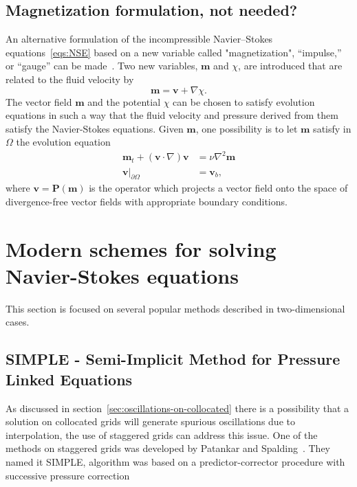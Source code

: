 \documentclass{article}
\begin{document}
	
	
	
	\subsection{Magnetization formulation, not needed?}
	
	
	An alternative formulation of the incompressible Navier–Stokes equations~\eqref{eqs:NSE} based on a new variable called "magnetization", “impulse,” or “gauge” can be made~\cite{Brown:2001}. Two new variables, $\boldsymbol{m}$ and $\chi$, are introduced that are related to the fluid velocity by
$$
\boldsymbol{m}=\boldsymbol{v}+\nabla \chi.
$$
The vector field $\boldsymbol{m}$ and the potential $\chi$ can be chosen to satisfy evolution equations in such a way that the fluid velocity and pressure derived from them satisfy the Navier-Stokes equations. Given $\boldsymbol{m}$, one possibility is to let $\boldsymbol{m}$ satisfy in $\Omega$ the evolution equation
$$
\begin{aligned}
\boldsymbol{m}_t+(\boldsymbol{v} \cdot \nabla) \boldsymbol{v} &=\nu \nabla^2 \boldsymbol{m} \\
\left.\boldsymbol{v}\right|_{\partial \Omega} &=\boldsymbol{v}_b,
\end{aligned}
$$
where $\boldsymbol{v}=\mathbf{P}(\boldsymbol{m})$ is the operator which projects a vector field onto the space of divergence-free vector fields with appropriate boundary conditions.
	

\section{Modern schemes for solving Navier-Stokes equations}

This section is focused on several popular methods described in two-dimensional cases.

\subsection{SIMPLE - Semi-Implicit Method for Pressure Linked Equations}

As discussed in section~\ref{sec:oscillations-on-collocated} there is a possibility that a solution on collocated grids will generate spurious oscillations due to interpolation, the use of staggered grids can address this issue. One of the methods on staggered grids was developed by Patankar and Spalding~\cite{Patankar:1972}. They named it SIMPLE, algorithm was based on a predictor-corrector procedure with successive pressure correction
\end{document}
